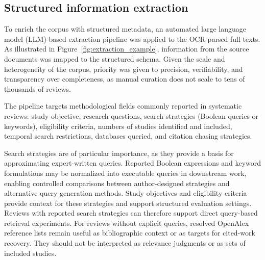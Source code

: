 \subsection*{Structured information extraction}
To enrich the corpus with structured metadata, an automated large language model (LLM)-based extraction pipeline was applied to the OCR-parsed full texts. As illustrated in Figure~\ref{fig:extraction_example}, information from the source documents was mapped to the structured schema. Given the scale and heterogeneity of the corpus, priority was given to precision, verifiability, and transparency over completeness, as manual curation does not scale to tens of thousands of reviews.

The pipeline targets methodological fields commonly reported in systematic reviews: study objective, research questions, search strategies (Boolean queries or keywords), eligibility criteria, numbers of studies identified and included, temporal search restrictions, databases queried, and citation chasing strategies.

Search strategies are of particular importance, as they provide a basis for approximating expert-written queries. Reported Boolean expressions and keyword formulations may be normalized into executable queries in downstream work, enabling controlled comparisons between author-designed strategies and alternative query-generation methods. Study objectives and eligibility criteria provide context for these strategies and support structured evaluation settings. Reviews with reported search strategies can therefore support direct query-based retrieval experiments. For reviews without explicit queries, resolved OpenAlex reference lists remain useful as bibliographic context or as targets for cited-work recovery. They should not be interpreted as relevance judgments or as sets of included studies.

